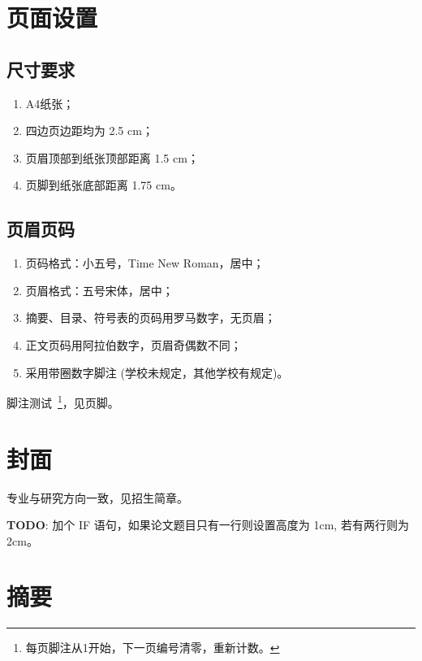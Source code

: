 \section{页面设置}

\subsection{尺寸要求}

\begin{enumerate}
	\item A4纸张；
	\item 四边页边距均为 2.5 cm；
	\item 页眉顶部到纸张顶部距离 1.5 cm；
	\item 页脚到纸张底部距离 1.75 cm。
\end{enumerate}

\subsection{页眉页码}

\begin{enumerate}
	\item 页码格式：小五号，Time New Roman，居中；
	\item 页眉格式：五号宋体，居中；
	\item 摘要、目录、符号表的页码用罗马数字，无页眉；
	\item 正文页码用阿拉伯数字，页眉奇偶数不同；
	\item 采用带圈数字脚注 (学校未规定，其他学校有规定)。
\end{enumerate}

脚注测试~\footnote{每页脚注从1开始，下一页编号清零，重新计数。}，见页脚。

\section{封面}

专业与研究方向一致，见招生简章。

\textbf{TODO}: 加个 IF 语句，如果论文题目只有一行则设置高度为 1cm, 若有两行则为 2cm。

\section{摘要}

